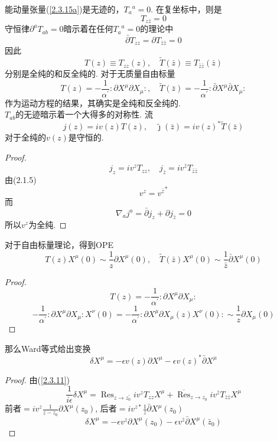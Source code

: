 能动量张量(\ref{2.3.15a})是无迹的，${T_a} ^a=0$. 在复坐标中，则是
\begin{equation}
T_{z \bar{z}}=0
\end{equation}
守恒律$\partial^a T_{ab}=0$暗示着在任何${T_a} ^a=0$的理论中
\begin{equation}
\bar{\partial} T_{z z}=\partial T_{\bar{z} \bar{z}}=0
\end{equation}
因此
\begin{equation}
T(z) \equiv T_{z z}(z), \quad \tilde{T}(\bar{z}) \equiv T_{\bar{z} \bar{z}}(\bar{z})
\end{equation}
分别是全纯的和反全纯的. 对于无质量自由标量
\begin{equation}\label{2.4.4}
T(z)=-\frac{1}{\alpha^{\prime}}: \partial X^{\mu} \partial X_{\mu}:, \quad \tilde{T}(\bar{z})=-\frac{1}{\alpha^{\prime}}: \bar{\partial} X^{\mu} \bar{\partial} X_{\mu}:
\end{equation}
作为运动方程的结果，其确实是全纯和反全纯的.\\
$T_{ab}$的无迹暗示着一个大得多的对称性. 流
\begin{equation}
j(z)=i v(z) T(z), \quad \tilde{\jmath}(\bar{z})=i v(z)^{*} \tilde{T}(\bar{z})
\end{equation}
对于全纯的$v(z)$是守恒的.
\begin{proof}
$$
j_{z}=i v^{z} T_{z z}, \quad j_{\bar{z}}=i v^{\bar{z}} T_{\bar{z} \bar{z}}
$$
由(2.1.5)
$$
v^{z}={v^{\bar{z}}}^*
$$
而
$$
\nabla_{a} j^{a}= \bar{\partial} j_{z}+\partial j_{\bar{z}}=0
$$
所以$v^z$为全纯.
\end{proof}
对于自由标量理论，得到OPE
\begin{equation}
T(z) X^{\mu}(0) \sim \frac{1}{z} \partial X^{\mu}(0), \quad \tilde{T}(\bar{z}) X^{\mu}(0) \sim \frac{1}{\bar{z}} \bar{\partial} X^{\mu}(0)
\end{equation}
\begin{proof}
$$
T(z)=-\frac{1}{\alpha^{\prime}}: \partial X^{\mu} \partial X_{\mu}:
$$
$$
-\frac{1}{\alpha^{\prime}}: \partial X^{\mu} \partial X_{\mu}: X^{\nu}(0)=-\frac{1}{\alpha^{\prime}}: \partial X^{\mu} \partial X_{\mu}(z) X^{\nu}(0):\sim \frac{1}{z} \partial X_{\mu} (0)
$$
\end{proof}
那么Ward等式给出变换
\begin{equation}\label{2.4.7}
\delta X^{\mu}=-\epsilon v(z) \partial X^{\mu}-\epsilon v(z)^{*} \bar{\partial} X^{\mu}
\end{equation}
\begin{proof}
由(\ref{2.3.11})
$$
\frac{1}{i \epsilon} \delta X^{\mu}=\operatorname{Res}_{z \rightarrow z_{0}^{\prime}} i v^{z} T_{z z} X^{\mu}+\overline{\operatorname{Res}}_{z \rightarrow z_{0}} i v^{\bar{z}} T_{\bar{z} \bar{z}} X^{\mu}
$$
前者$=i v^{z} \frac{1}{z-z_0} \partial X^{\mu}\left(z_{0}\right)$,
后者$=i v^{z *} \frac{1}{z} \bar{\partial} X^{\mu}\left(z_{0}\right)$
$$
\delta X^{\mu}=-\epsilon v^{z} \partial X^{\mu}\left(z_{0}\right)-\epsilon v^{\bar{z}} \bar{\partial} X^{\mu}\left(\bar{z}_{0}\right)
$$
\end{proof}
